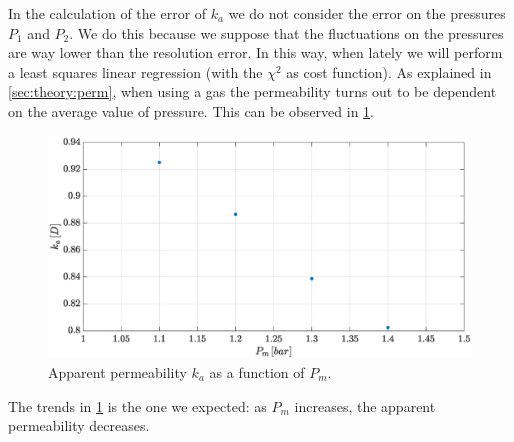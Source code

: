 \documentclass[10pt, a4paper]{amsart}
\begin{document}
In the calculation of the error of $k_a$ we do not consider the error on the pressures $P_1$ and $P_2$. We do this because we suppose that the fluctuations on the pressures are way lower than the resolution error. In this way, when lately we will perform a least squares linear regression (with the $\chi^2$ as cost function).
As explained in \cref{sec:theory:perm}, when using a gas the permeability turns out to be dependent on the average value of pressure. This can be observed in \cref{fig:Trend2}. 
\begin{figure}[H]
    \centering
    \includegraphics[width=\textwidth]{Trend_Core1.eps}
    \caption{Apparent permeability $k_a$ as a function of $P_m$.}
    \label{fig:Trend2}
\end{figure}
The trends in \cref{fig:Trend2} is the one we expected: as $P_m$ increases, the apparent permeability decreases.
\end{document}
